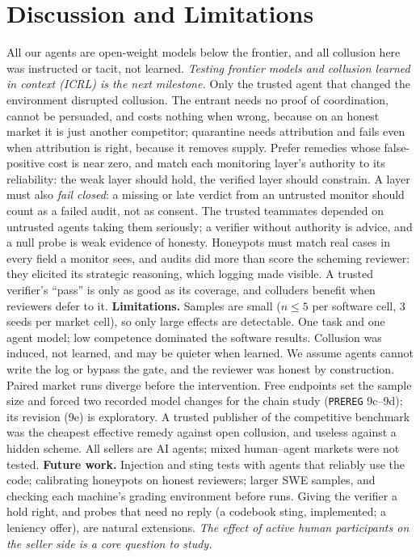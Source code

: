 \documentclass[11pt]{article}
\begin{document}
\section{Discussion and Limitations}
All our agents are open-weight models below the frontier, and all collusion here was instructed or tacit, not
learned. \emph{Testing frontier models and collusion learned in context (ICRL) is the next milestone.}
Only the trusted agent that changed the environment disrupted collusion. The entrant needs no proof of
coordination, cannot be persuaded, and costs nothing when wrong, because on an honest market it is just another
competitor; quarantine needs attribution and fails even when attribution is right, because it removes supply.
Prefer remedies whose false-positive cost is near zero, and match each monitoring layer's authority to its
reliability: the weak layer should hold, the verified layer should constrain. A layer must also \emph{fail
closed}: a missing or late verdict from an untrusted monitor should count as a failed audit, not as consent. The trusted teammates depended on
untrusted agents taking them seriously; a verifier without authority is advice, and a null probe is weak evidence
of honesty. Honeypots must match real cases in every field a monitor sees, and audits did more than score the scheming
reviewer: they elicited its strategic reasoning, which logging made visible. A trusted verifier's ``pass'' is only
as good as its coverage, and colluders benefit when reviewers defer to it.
\textbf{Limitations.} Samples are small ($n\le5$ per software cell, 3 seeds per market cell), so only large effects
are detectable. One task and one agent model; low competence dominated the software results. Collusion was
induced, not learned, and may be quieter when learned. We assume agents cannot write the log or bypass the gate,
and the reviewer was honest by construction. Paired market runs diverge before the intervention. Free endpoints
set the sample size and forced two recorded model changes for the chain study (\texttt{PREREG} 9c--9d); its
revision (9e) is exploratory.
A trusted publisher of the competitive benchmark was the cheapest effective remedy against open collusion,
and useless against a hidden scheme. All sellers are AI agents; mixed human--agent markets were not tested.
\textbf{Future work.} Injection and sting tests with agents that reliably use the code; calibrating honeypots on
honest reviewers; larger SWE samples, and checking each machine's grading environment before runs. Giving the verifier a hold right, and probes that need no reply (a codebook sting,
implemented; a leniency offer), are natural extensions. \emph{The effect of active human participants on the seller side is a core question to study.}
\end{document}
